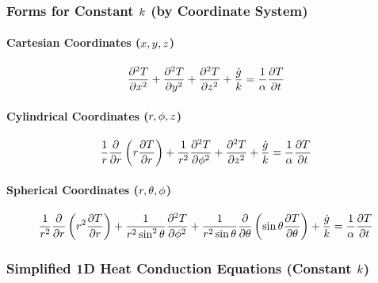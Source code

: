 \subsubsection*{Forms for Constant $k$ (by Coordinate System)}
\paragraph*{Cartesian Coordinates ($x, y, z$)}
\begin{equation}
\label{eq:hce_cartesian_constant_k_formula_full_formula}
    \frac{\partial^2 T}{\partial x^2} + \frac{\partial^2 T}{\partial y^2} + \frac{\partial^2 T}{\partial z^2} + \frac{\dot{g}}{k} = \frac{1}{\alpha} \frac{\partial T}{\partial t}
\end{equation}

\paragraph*{Cylindrical Coordinates ($r, \phi, z$)}
\begin{equation}
\label{eq:hce_cylindrical_constant_k_formula_full_formula}
    \frac{1}{r} \frac{\partial}{\partial r}\left(r \frac{\partial T}{\partial r}\right) + \frac{1}{r^2} \frac{\partial^2 T}{\partial \phi^2} + \frac{\partial^2 T}{\partial z^2} + \frac{\dot{g}}{k} = \frac{1}{\alpha} \frac{\partial T}{\partial t}
\end{equation}

\paragraph*{Spherical Coordinates ($r, \theta, \phi$)}
\begin{equation}
\label{eq:hce_spherical_constant_k_formula_full_formula}
    \frac{1}{r^2} \frac{\partial}{\partial r}\left(r^2 \frac{\partial T}{\partial r}\right) + \frac{1}{r^2 \sin^2 \theta} \frac{\partial^2 T}{\partial \phi^2} + \frac{1}{r^2 \sin \theta} \frac{\partial}{\partial \theta}\left(\sin \theta \frac{\partial T}{\partial \theta}\right) + \frac{\dot{g}}{k} = \frac{1}{\alpha} \frac{\partial T}{\partial t}
\end{equation}

\subsubsection*{Simplified 1D Heat Conduction Equations (Constant $k$)}
